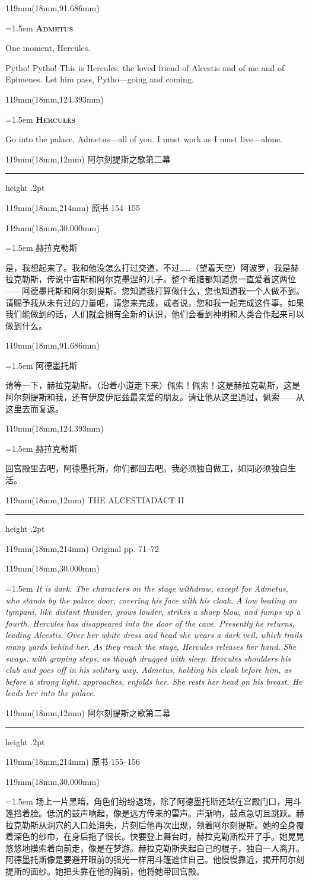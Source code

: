 \documentclass{article}
\newcommand{\ENsetup}{\normalfont\color{ink}\fontsize{11}{16.5}\selectfont\emergencystretch=1.5em}
\newcommand{\ZHsetup}{\normalfont\color{ink}\fontsize{10.5}{17}\selectfont\emergencystretch=1.5em}
\newcommand{\ENspeaker}[1]{{\fontsize{9.8}{13}\selectfont\scshape\bfseries #1}\par\vspace{3pt}}
\newcommand{\ZHspeaker}[1]{{\hei\fontsize{10.3}{13}\selectfont #1}\par\vspace{3pt}}
\newcommand{\ENstage}[1]{\par\noindent{\itshape #1}\par}
\newcommand{\Block}[3]{\begin{textblock*}{119mm}(18mm,#1mm){#2 #3\par}\end{textblock*}}
\newcommand{\Heading}[3]{%
  \begin{textblock*}{119mm}(18mm,12mm)
    \color{quiet}\fontsize{7.5}{10}\selectfont
    #1\hfill #2\par\vspace{3mm}\hrule height .2pt
  \end{textblock*}
  \begin{textblock*}{119mm}(18mm,214mm)
    \color{quiet}\fontsize{7}{10}\selectfont #3\hfill\thepage
  \end{textblock*}
}
\begin{document}
\Block{91.686}{\ENsetup}{\ENspeaker{Admetus}
One moment, Hercules.\par
\ENstage{He goes down the path.}
Pytho! Pytho! This is Hercules, the loved friend of Alcestis and of me and of Epimenes. Let him pass, Pytho—going and coming.\par}
\Block{124.393}{\ENsetup}{\ENspeaker{Hercules}
Go into the palace, Admetus—all of you. I must work as I must live—alone.\par}
\newpage
\null
\Heading{阿尔刻提斯之歌}{第二幕}{原书 154–155}
\Block{30.000}{\ZHsetup}{\ZHspeaker{赫拉克勒斯}是，我想起来了。我和他没怎么打过交道，不过……{\kai （望着天空）}阿波罗，我是赫拉克勒斯，传说中宙斯和阿尔克墨涅的儿子。整个希腊都知道您一直爱着这两位——阿德墨托斯和阿尔刻提斯。您知道我打算做什么，您也知道我一个人做不到。请赐予我从未有过的力量吧，请您来完成，或者说，您和我一起完成这件事。如果我们能做到的话，人们就会拥有全新的认识，他们会看到神明和人类合作起来可以做到什么。\par }
\Block{91.686}{\ZHsetup}{\ZHspeaker{阿德墨托斯}请等一下，赫拉克勒斯。{\kai （沿着小道走下来）}佩索！佩索！这是赫拉克勒斯，这是阿尔刻提斯和我，还有伊皮伊尼兹最亲爱的朋友。请让他从这里通过，佩索——从这里去而复返。\par }
\Block{124.393}{\ZHsetup}{\ZHspeaker{赫拉克勒斯}回宫殿里去吧，阿德墨托斯，你们都回去吧。我必须独自做工，如同必须独自生活。\par }
\newpage
\null
\Heading{THE ALCESTIAD}{ACT II}{Original pp. 71–72}
\Block{30.000}{\ENsetup}{\itshape 
It is dark. The characters on the stage withdraw, except for Admetus, who stands by the palace door, covering his face with his cloak. A low beating on tympani, like distant thunder, grows louder, strikes a sharp blow, and jumps up a fourth. Hercules has disappeared into the door of the cave. Presently he returns, leading Alcestis. Over her white dress and head she wears a dark veil, which trails many yards behind her. As they reach the stage, Hercules releases her hand. She sways, with groping steps, as though drugged with sleep. Hercules shoulders his club and goes off in his solitary way. Admetus, holding his cloak before him, as before a strong light, approaches, enfolds her. She rests her head on his breast. He leads her into the palace.\par}
\newpage
\null
\Heading{阿尔刻提斯之歌}{第二幕}{原书 155–156}
\Block{30.000}{\ZHsetup}{\kai 场上一片黑暗，角色们纷纷退场，除了阿德墨托斯还站在宫殿门口，用斗篷挡着脸。低沉的鼓声响起，像是远方传来的雷声。声渐响，鼓点急切且跳跃。赫拉克勒斯从洞穴的入口处消失，片刻后他再次出现，领着阿尔刻提斯。她的全身覆着深色的纱巾，在身后拖了很长。快要登上舞台时，赫拉克勒斯松开了手。她晃晃悠悠地摸索着向前走，像是在梦游。赫拉克勒斯夹起自己的棍子，独自一人离开。阿德墨托斯像是要避开眼前的强光一样用斗篷遮住自己。他慢慢靠近，揭开阿尔刻提斯的面纱。她把头靠在他的胸前，他将她带回宫殿。\par }
\end{document}

